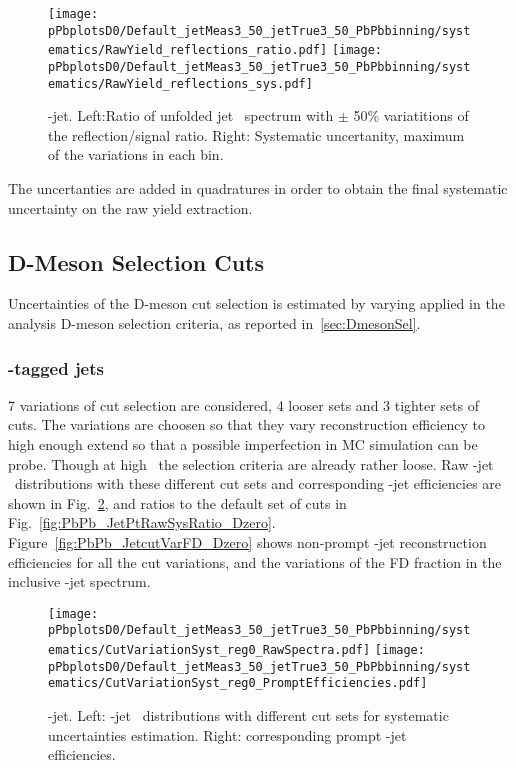\begin{figure}[bth]
\begin{center}
\texttt{[image: pPbplotsD0/Default\_jetMeas3\_50\_jetTrue3\_50\_PbPbbinning/systematics/RawYield\_reflections\_ratio.pdf]}
\texttt{[image: pPbplotsD0/Default\_jetMeas3\_50\_jetTrue3\_50\_PbPbbinning/systematics/RawYield\_reflections\_sys.pdf]}
\caption{\Dzero-jet. Left:Ratio of unfolded jet \pt\ spectrum with $\pm$ 50\% variatitions of the reflection/signal ratio. Right: Systematic uncertanity, maximum of the variations in each bin.} 
\label{fig:PbPb_JetPtSys_Dzero_Refl}
\end{center}
\end{figure}


The uncertanties are added in quadratures in order to obtain the final systematic uncertainty on the raw yield extraction. 

\subsection{D-Meson Selection Cuts}
Uncertainties of the D-meson cut selection is estimated by varying applied in the analysis D-meson selection criteria, as reported in~\ref{sec:DmesonSel}. 


\subsubsection{\Dzero-tagged jets}

7 variations of cut selection are considered, 4 looser sets and 3 tighter sets of cuts. The variations are choosen so that they vary \Dzero reconstruction efficiency to high enough extend so that a possible imperfection in MC simulation can be probe. Though at high \ptd\ the selection criteria are already rather loose.
Raw \Dzero-jet \pt\ distributions with these different cut sets and corresponding \Dzero-jet efficiencies are shown in Fig.~\ref{fig:PbPb_JetPtRawSys_Dzero}, and ratios to the default set of cuts in Fig.~\ref{fig:PbPb_JetPtRawSysRatio_Dzero}.
Figure~\ref{fig:PbPb_JetcutVarFD_Dzero} shows non-prompt \Dzero-jet reconstruction efficiencies for all the cut variations, and the variations of the FD fraction in the inclusive \Dzero-jet spectrum.

\begin{figure}[bth]
\begin{center}
\texttt{[image: pPbplotsD0/Default\_jetMeas3\_50\_jetTrue3\_50\_PbPbbinning/systematics/CutVariationSyst\_reg0\_RawSpectra.pdf]}
\texttt{[image: pPbplotsD0/Default\_jetMeas3\_50\_jetTrue3\_50\_PbPbbinning/systematics/CutVariationSyst\_reg0\_PromptEfficiencies.pdf]}
\caption{\Dzero-jet. Left: \Dzero-jet \pt\ distributions with different cut sets for systematic uncertainties estimation. Right: corresponding prompt \Dzero-jet efficiencies.} 
\label{fig:PbPb_JetPtRawSys_Dzero}
\end{center}
\end{figure}

